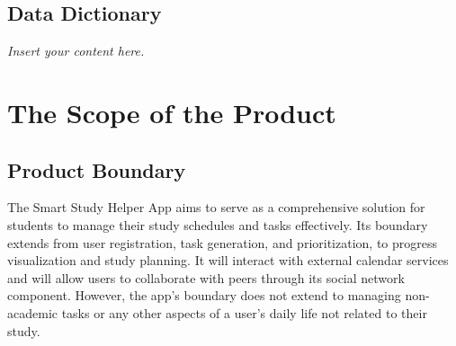 \documentclass[12pt]{article}
\newcommand{\lips}{\textit{Insert your content here.}}
\begin{document}
\subsection{Data Dictionary}
\lips

\section{The Scope of the Product}

\subsection{Product Boundary}
The Smart Study Helper App aims to serve as a comprehensive solution for students to manage their study schedules and tasks effectively. Its boundary extends from user registration, task generation, and prioritization, to progress visualization and study planning. It will interact with external calendar services and will allow users to collaborate with peers through its social network component. However, the app’s boundary does not extend to managing non-academic tasks or any other aspects of a user’s daily life not related to their study.
\end{document}

